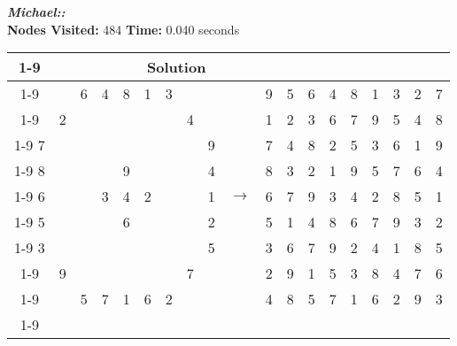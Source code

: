 \documentclass{article}
\begin{document}
\small\emph{\textbf{Michael::}}\\ \textbf{Nodes Visited:} 484 \textbf{Time:} 0.040 seconds\\
\begin{tabular}{||c|c|c||c|c|c||c|c|c|| c ||c|c|c||c|c|c||c|c|c||}
  \cmidrule{1-9} \cmidrule{11-19}
  \multicolumn{9}{|c|}{Problem} &                   & \multicolumn{9}{|c|}{Solution}   \\\cmidrule{1-9} \cmidrule{11-19} \morecmidrules \cmidrule{1-9} \cmidrule{11-19}
  &   & 6 & 4 & 8 & 1 & 3 &   &   &  & 9 & 5 & 6 & 4 & 8 & 1 & 3 & 2 & 7\\\cmidrule{1-9} \cmidrule{11-19}
  & 2 &   &   &   &   &   & 4 &   &  & 1 & 2 & 3 & 6 & 7 & 9 & 5 & 4 & 8\\\cmidrule{1-9} \cmidrule{11-19}
7 &   &   &   &   &   &   &   & 9 &  & 7 & 4 & 8 & 2 & 5 & 3 & 6 & 1 & 9\\\cmidrule{1-9} \cmidrule{11-19} \morecmidrules \cmidrule{1-9} \cmidrule{11-19}
8 &   &   &   & 9 &   &   &   & 4 &  & 8 & 3 & 2 & 1 & 9 & 5 & 7 & 6 & 4\\\cmidrule{1-9} \cmidrule{11-19}
6 &   &   & 3 & 4 & 2 &   &   & 1 & $\rightarrow$ & 6 & 7 & 9 & 3 & 4 & 2 & 8 & 5 & 1\\\cmidrule{1-9} \cmidrule{11-19}
5 &   &   &   & 6 &   &   &   & 2 &  & 5 & 1 & 4 & 8 & 6 & 7 & 9 & 3 & 2\\\cmidrule{1-9} \cmidrule{11-19} \morecmidrules \cmidrule{1-9} \cmidrule{11-19}
3 &   &   &   &   &   &   &   & 5 &  & 3 & 6 & 7 & 9 & 2 & 4 & 1 & 8 & 5\\\cmidrule{1-9} \cmidrule{11-19}
  & 9 &   &   &   &   &   & 7 &   &  & 2 & 9 & 1 & 5 & 3 & 8 & 4 & 7 & 6\\\cmidrule{1-9} \cmidrule{11-19}
  &   & 5 & 7 & 1 & 6 & 2 &   &   &  & 4 & 8 & 5 & 7 & 1 & 6 & 2 & 9 & 3\\\cmidrule{1-9} \cmidrule{11-19} \morecmidrules \cmidrule{1-9} \cmidrule{11-19}
 \end{tabular}
\\
\end{document}
